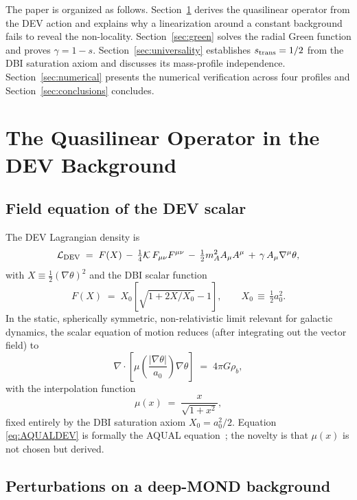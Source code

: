 \documentclass[aps,prd,twocolumn,superscriptaddress,nofootinbib]{revtex4-2}
\begin{document}
The paper is organized as follows. Section~\ref{sec:operator}
derives the quasilinear operator from the DEV action and explains
why a linearization around a constant background fails to reveal
the non-locality. Section~\ref{sec:green} solves the radial Green
function and proves $\gamma = 1-s$. Section~\ref{sec:universality}
establishes $s_{\rm trans} = 1/2$ from the DBI saturation axiom and
discusses its mass-profile independence. Section~\ref{sec:numerical}
presents the numerical verification across four profiles and
Section~\ref{sec:conclusions} concludes.

\section{The Quasilinear Operator in the DEV Background}\label{sec:operator}

\subsection{Field equation of the DEV scalar}

The DEV Lagrangian density is~\cite{DEV_paperI}
\begin{equation}
\mathcal{L}_{\rm DEV} \;=\; F(X) \,-\, \tfrac{1}{4}\mathcal{K}\,
F_{\mu\nu}F^{\mu\nu} \,-\, \tfrac{1}{2}m_A^2 A_\mu A^\mu \,+\,
\gamma\,A_\mu\nabla^\mu\theta,
\label{eq:LDEV}
\end{equation}
with $X \equiv \tfrac{1}{2}(\nabla\theta)^2$ and the DBI scalar
function
\begin{equation}
F(X) \;=\; X_0\!\left[\sqrt{1 + 2X/X_0} - 1\right], \qquad
X_0 \,\equiv\, \tfrac{1}{2}a_0^2.
\label{eq:Fdbi}
\end{equation}
In the static, spherically symmetric, non-relativistic limit
relevant for galactic dynamics, the scalar equation of motion
reduces (after integrating out the vector field) to
\begin{equation}
\nabla\!\cdot\!\left[\mu\!\left(\frac{|\nabla\theta|}{a_0}\right)
\nabla\theta\right] \;=\; 4\pi G\rho_b,
\label{eq:AQUALDEV}
\end{equation}
with the interpolation function
\begin{equation}
\mu(x) \;=\; \frac{x}{\sqrt{1+x^2}},
\label{eq:mu}
\end{equation}
fixed entirely by the DBI saturation axiom $X_0=a_0^2/2$. Equation
\eqref{eq:AQUALDEV} is formally the AQUAL equation~\cite{BM1984};
the novelty is that $\mu(x)$ is not chosen but derived.

\subsection{Perturbations on a deep-MOND background}
\end{document}
